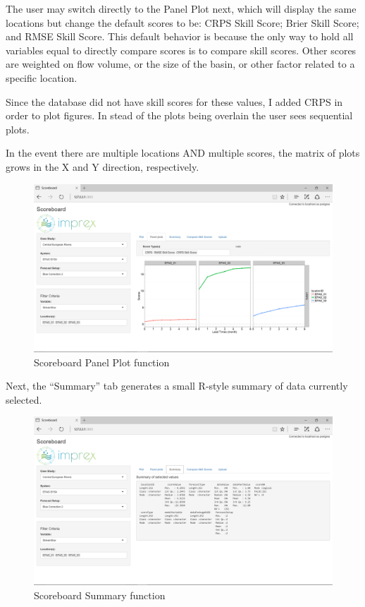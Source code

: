 \documentclass[logos,parttoc,morelanguage=french,morelanguage=german]{orsay-memoire}
\begin{document}
The user may switch directly to the Panel Plot next, which will display the same locations but change the default scores to be: CRPS Skill Score; Brier Skill Score; and RMSE Skill Score. This default behavior is because the only way to hold all variables equal to directly compare scores is to compare skill scores. Other scores are weighted on flow volume, or the size of the basin, or other factor related to a specific location.

Since the database did not have skill scores for these values, I added CRPS in order to plot figures. In stead of the plots being overlain the user sees sequential plots.

In the event there are multiple locations AND multiple scores, the matrix of plots grows in the X and Y direction, respectively.

\begin{figure}[hb]
\centering
  \includegraphics[width=0.9\linewidth]{images/isb2.png}
  \caption{Scoreboard Panel Plot function}
  \label{fig:isb2}
\end{figure}

Next, the ``Summary'' tab generates a small R-style summary of data currently selected. 

\begin{figure}[hb]
\centering
\includegraphics[width=0.9\linewidth]{images/isb3.png}
  \caption{Scoreboard Summary function}
  \label{fig:isb3}
\end{figure}
\end{document}
